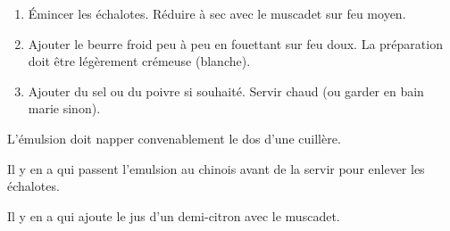 
\begin{ingredients}
\end{ingredients}


\begin{recipe}
  \begin{enumerate}

  \item Émincer les échalotes.  Réduire à sec avec le muscadet
    sur feu moyen.

  \item Ajouter le beurre froid peu à peu en fouettant sur feu doux.  La
    préparation doit être légèrement crémeuse (blanche).

  \item Ajouter du sel ou du poivre si souhaité.  Servir chaud (ou
    garder en bain marie sinon).

  \end{enumerate}

  L'émulsion doit napper convenablement le dos d'une cuillère.

  Il y en a qui passent l'emulsion au chinois avant de la servir pour
  enlever les échalotes.

  Il y en a qui ajoute le jus d'un demi-citron avec le muscadet.
\end{recipe}
